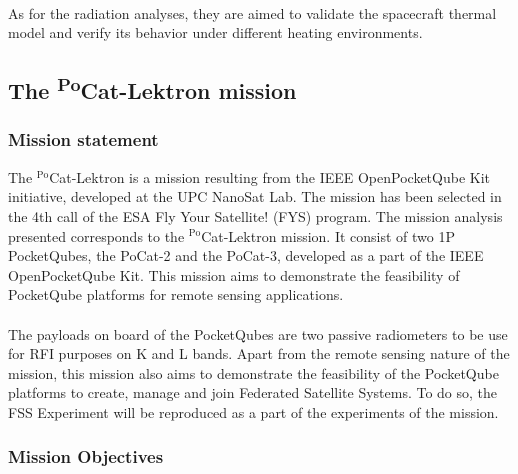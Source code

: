 \paragraph{}
As for the radiation analyses, they are aimed to validate the spacecraft thermal model
and verify its behavior under different heating environments.

\subsection{The \texorpdfstring{\textsuperscript{Po}}CCat-Lektron mission}

\subsubsection{Mission statement}

The $^{\text{Po}}$Cat-Lektron is a mission resulting from the IEEE OpenPocketQube Kit initiative, 
developed at the UPC NanoSat Lab. The mission has been selected in the 4th call of 
the ESA Fly Your Satellite! (FYS) program. The mission analysis presented corresponds 
to the $^{\text{Po}}$Cat-Lektron mission. It consist of two 1P PocketQubes, the PoCat-2 and the 
PoCat-3, developed as a part of the IEEE OpenPocketQube Kit. This mission aims to 
demonstrate the feasibility of PocketQube platforms for remote sensing applications.\cite{wiki}
\paragraph{}
The payloads on board of the PocketQubes are two passive radiometers to be use for 
RFI purposes on K and L bands. Apart from the remote sensing nature of the mission, 
this mission also aims to demonstrate the feasibility of the PocketQube platforms to 
create, manage and join Federated Satellite Systems. To do so, the FSS Experiment 
will be reproduced as a part of the experiments of the mission.

\subsubsection{Mission Objectives}


